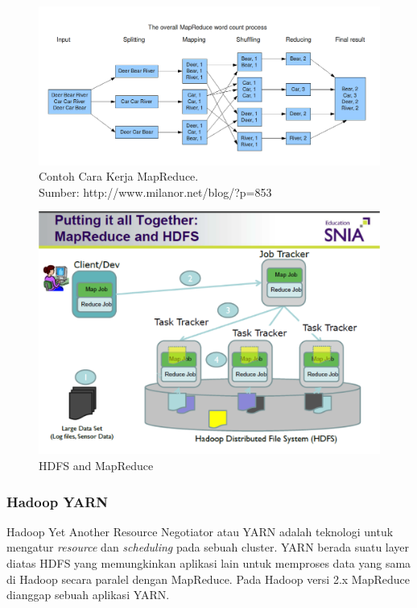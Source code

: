\begin{figure}
	\centering
	\includegraphics[scale=0.4]{Gambar/MapReduce_Work_Structure.png}
	\caption[Contoh Cara Kerja MapReduce]{Contoh Cara Kerja MapReduce. \\Sumber: http://www.milanor.net/blog/?p=853}
\end{figure}


\begin{figure}
	\label{fig:hdfs_architecture}
	\centering
	\includegraphics[scale=0.5]{Gambar/hdfs-architecture.png}
	\caption[HDFS and MapReduce]{HDFS and MapReduce} 
\end{figure}
	
\subsubsection{Hadoop YARN}
Hadoop Yet Another Resource Negotiator atau YARN adalah teknologi untuk mengatur \textit{resource} dan \textit{scheduling} pada sebuah cluster. YARN berada suatu layer diatas HDFS yang memungkinkan aplikasi lain untuk memproses data yang sama di Hadoop secara paralel dengan MapReduce. Pada Hadoop versi 2.x MapReduce dianggap sebuah aplikasi YARN.
	
